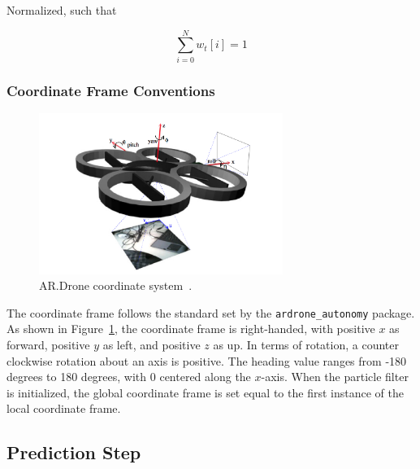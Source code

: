 		Normalized, such that

		\[
		\sum_{i=0}^N w_t[i] = 1
		\]


		\subsubsection{Coordinate Frame Conventions}

			\begin{figure}
			\centering
				\includegraphics[width=300px]{../images/coordinates.png}
				\caption{AR.Drone coordinate system~\cite{ARDroneEducation}.}\label{fig:coords}
			\end{figure}

			The coordinate frame follows the standard set by the \texttt{ardrone\_autonomy} package. As shown in Figure~\ref{fig:coords}, the coordinate frame is right-handed, with positive $x$ as forward, positive $y$ as left, and positive $z$ as up. In terms of rotation, a counter clockwise rotation about an axis is positive. The heading value ranges from -180 degrees to 180 degrees, with 0 centered along the $x$-axis. When the particle filter is initialized, the global coordinate frame is set equal to the first instance of the local coordinate frame.


	\subsection{Prediction Step}

